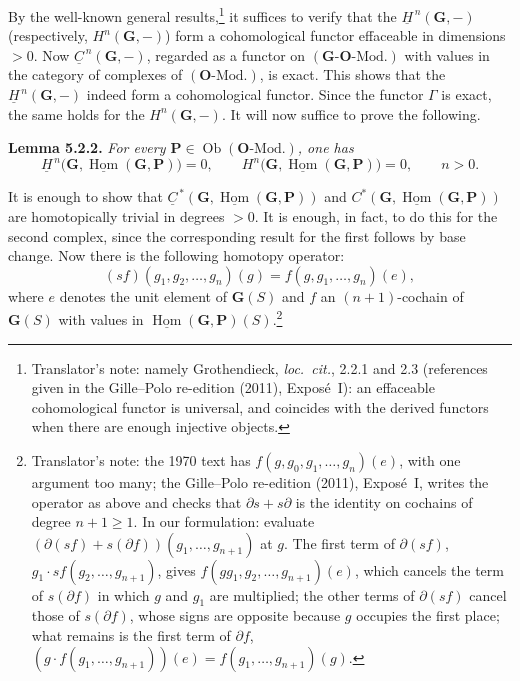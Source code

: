 By the well-known general results,\footnote{Translator's note: namely Grothendieck, \textit{loc.\ cit.}, 2.2.1 and 2.3
(references given in the Gille--Polo re-edition (2011), Exposé~I): an
effaceable cohomological functor is universal, and coincides with the
derived functors when there are enough injective objects.} it suffices to verify that the
\(\underline H^{\,n}(\mathbf G,-)\) (respectively, \(H^n(\mathbf G,-)\))
form a cohomological functor effaceable in dimensions \(>0\). Now
\(\underline C^{\,n}(\mathbf G,-)\), regarded as a functor on
\((\mathbf G\text{-}\mathbf O\text{-Mod.})\) with values in the category of
complexes of \((\mathbf O\text{-Mod.})\), is exact. This shows that the
\(\underline H^{\,n}(\mathbf G,-)\) indeed form a cohomological functor.
Since the functor \(\Gamma\) is exact, the same holds for the
\(H^n(\mathbf G,-)\). It will now suffice to prove the following.

\medskip
\noindent{}\textbf{Lemma 5.2.2.}
\textit{For every \(\mathbf P\in\operatorname{Ob}(\mathbf O\text{-Mod.})\),
one has}
\[
  \underline H^{\,n}\bigl(
    \mathbf G,\underline{\operatorname{Hom}}(\mathbf G,\mathbf P)
  \bigr)=0,
  \qquad
  H^n\bigl(
    \mathbf G,\underline{\operatorname{Hom}}(\mathbf G,\mathbf P)
  \bigr)=0,
  \qquad n>0.
\]

It is enough to show that
\(\underline C^{\,*}
  (\mathbf G,\underline{\operatorname{Hom}}(\mathbf G,\mathbf P))\) and
\(C^*(\mathbf G,\underline{\operatorname{Hom}}(\mathbf G,\mathbf P))\)
are homotopically trivial in degrees \(>0\). It is enough, in fact, to do
this for the second complex, since the corresponding result for the first
follows by base change. Now there is the following homotopy operator:
\[
  (sf)(g_1,g_2,\ldots,g_n)(g)=f(g,g_1,\ldots,g_n)(e),
\]
where \(e\) denotes the unit element of \(\mathbf G(S)\) and \(f\) an
\((n+1)\)-cochain of \(\mathbf G(S)\) with values in
\(\underline{\operatorname{Hom}}(\mathbf G,\mathbf P)(S)\).\footnote{Translator's note: the 1970 text has \(f(g,g_0,g_1,\ldots,g_n)(e)\),
with one argument too many; the Gille--Polo re-edition (2011), Exposé~I,
writes the operator as above and checks that \(\partial s+s\partial\) is the
identity on cochains of degree \(n+1\geq1\). In our formulation: evaluate
\((\partial(sf)+s(\partial f))(g_1,\ldots,g_{n+1})\) at \(g\). The first term
of \(\partial(sf)\), \(g_1\cdot sf(g_2,\ldots,g_{n+1})\), gives
\(f(gg_1,g_2,\ldots,g_{n+1})(e)\), which cancels the term of \(s(\partial f)\)
in which \(g\) and \(g_1\) are multiplied; the other terms of
\(\partial(sf)\) cancel those of \(s(\partial f)\), whose signs are opposite
because \(g\) occupies the first place; what remains is the first term of
\(\partial f\), \((g\cdot f(g_1,\ldots,g_{n+1}))(e)=f(g_1,\ldots,g_{n+1})(g)\).}

